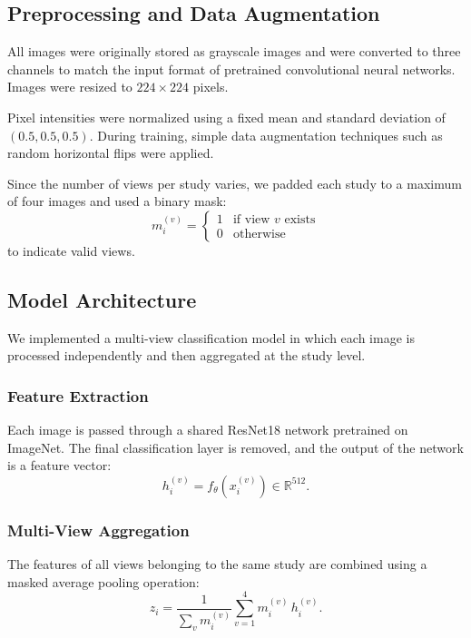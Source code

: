 \documentclass[12pt,a4paper]{article}
\begin{document}
\subsection{Preprocessing and Data Augmentation}

All images were originally stored as grayscale images and were converted to three channels to match the input format of pretrained convolutional neural networks. Images were resized to $224 \times 224$ pixels.

Pixel intensities were normalized using a fixed mean and standard deviation of $(0.5, 0.5, 0.5)$. During training, simple data augmentation techniques such as random horizontal flips were applied.

Since the number of views per study varies, we padded each study to a maximum of four images and used a binary mask:
\begin{equation}
m_i^{(v)} =
\begin{cases}
1 & \text{if view } v \text{ exists} \\
0 & \text{otherwise}
\end{cases}
\end{equation}
to indicate valid views.

\subsection{Model Architecture}

We implemented a multi-view classification model in which each image is processed independently and then aggregated at the study level.

\subsubsection{Feature Extraction}

Each image is passed through a shared ResNet18 network pretrained on ImageNet\cite{he_deep_2016}. The final classification layer is removed, and the output of the network is a feature vector:
\begin{equation}
h_i^{(v)} = f_{\theta}(x_i^{(v)}) \in \mathbb{R}^{512}.
\end{equation}

\subsubsection{Multi-View Aggregation}

The features of all views belonging to the same study are combined using a masked average pooling operation:
\begin{equation}
z_i = \frac{1}{\sum_{v} m_i^{(v)}} \sum_{v=1}^{4} m_i^{(v)} \, h_i^{(v)}.
\end{equation}
\end{document}
